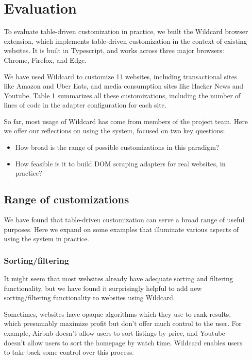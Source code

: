 \documentclass[sigplan,10pt,anonymous,review]{acmart}
\providecommand{\tightlist}{%
  \setlength{\itemsep}{0pt}\setlength{\parskip}{0pt}}
\begin{document}
\hypertarget{sec:evaluation}{%
\section{Evaluation}\label{sec:evaluation}}

To evaluate table-driven customization in practice, we built the
Wildcard browser extension, which implements table-driven customization
in the context of existing websites. It is built in Typescript, and
works across three major browsers: Chrome, Firefox, and Edge.

We have used Wildcard to customize 11 websites, including transactional
sites like Amazon and Uber Eats, and media consumption sites like Hacker
News and Youtube. Table 1 summarizes all these customizations, including
the number of lines of code in the adapter configuration for each site.

So far, most usage of Wildcard has come from members of the project
team. Here we offer our reflections on using the system, focused on two
key questions:

\begin{itemize}
\tightlist
\item
  How broad is the range of possible customizations in this paradigm?
\item
  How feasible is it to build DOM scraping adapters for real websites,
  in practice?
\end{itemize}

\hypertarget{range-of-customizations}{%
\subsection{Range of customizations}\label{range-of-customizations}}

We have found that table-driven customization can serve a broad range of
useful purposes. Here we expand on some examples that illuminate various
aspects of using the system in practice.

\hypertarget{sortingfiltering}{%
\subsubsection{Sorting/filtering}\label{sortingfiltering}}

It might seem that most websites already have adequate sorting and
filtering functionality, but we have found it surprisingly helpful to
add new sorting/filtering functionality to websites using Wildcard.

Sometimes, websites have opaque algorithms which they use to rank
results, which presumably maximize profit but don't offer much control
to the user. For example, Airbnb doesn't allow users to sort listings by
price, and Youtube doesn't allow users to sort the homepage by watch
time. Wildcard enables users to take back some control over this
process.
\end{document}
